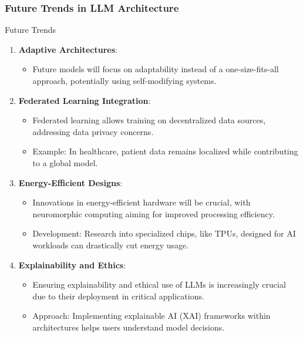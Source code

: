 \documentclass[aspectratio=169]{beamer}
\begin{document}
\begin{frame}[fragile]
    \frametitle{Future Trends in LLM Architecture}
    
    \begin{block}{Future Trends}
        \begin{enumerate}
            \item \textbf{Adaptive Architectures}:
            \begin{itemize}
                \item Future models will focus on adaptability instead of a one-size-fits-all approach, potentially using self-modifying systems.
            \end{itemize}

            \item \textbf{Federated Learning Integration}:
            \begin{itemize}
                \item Federated learning allows training on decentralized data sources, addressing data privacy concerns.
                \item Example: In healthcare, patient data remains localized while contributing to a global model.
            \end{itemize}

            \item \textbf{Energy-Efficient Designs}:
            \begin{itemize}
                \item Innovations in energy-efficient hardware will be crucial, with neuromorphic computing aiming for improved processing efficiency.
                \item Development: Research into specialized chips, like TPUs, designed for AI workloads can drastically cut energy usage.
            \end{itemize}

            \item \textbf{Explainability and Ethics}:
            \begin{itemize}
                \item Ensuring explainability and ethical use of LLMs is increasingly crucial due to their deployment in critical applications.
                \item Approach: Implementing explainable AI (XAI) frameworks within architectures helps users understand model decisions.
            \end{itemize}
        \end{enumerate}
    \end{block}
\end{frame}
\end{document}
